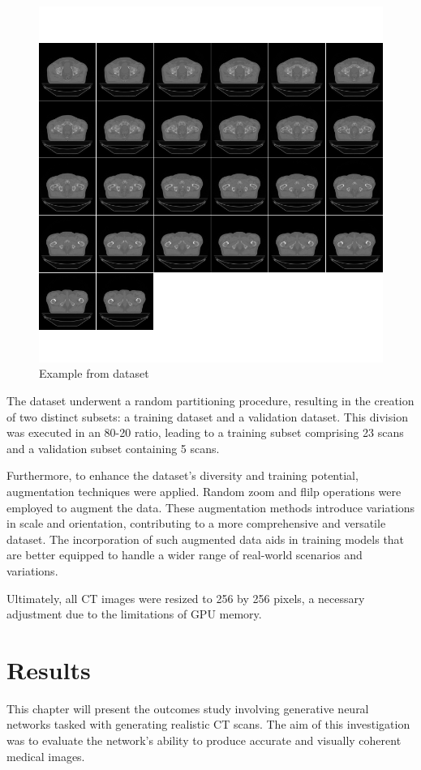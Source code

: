 \documentclass[11pt,a4paper]{report}
\begin{document}
\begin{figure}[H]
	\centering
	\includegraphics[scale=0.5]{images/datasetExample}
    \caption{Example from dataset}
\end{figure}
The dataset underwent a random partitioning procedure, resulting in the creation of two distinct subsets: a training dataset and a validation dataset. This division was executed in an 80-20 ratio, leading to a training subset comprising 23 scans and a validation subset containing 5 scans.

Furthermore, to enhance the dataset's diversity and training potential, augmentation techniques were applied. Random zoom and flilp operations were employed to augment the data. These augmentation methods introduce variations in scale and orientation, contributing to a more comprehensive and versatile dataset. The incorporation of such augmented data aids in training models that are better equipped to handle a wider range of real-world scenarios and variations.

Ultimately, all CT images were resized to 256 by 256 pixels, a necessary adjustment due to the limitations of GPU memory.


\chapter{Results}
This chapter will present the outcomes study involving generative neural networks tasked with generating realistic CT scans. The aim of this investigation was to evaluate the network's ability to produce accurate and visually coherent medical images.
\end{document}
